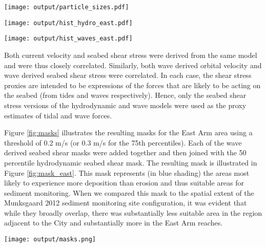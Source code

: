 \documentclass[a4paper]{article}
\let\origfigure=\figure
\let\endorigfigure=\endfigure
\renewenvironment{figure}[1][]{%
   \origfigure[H]
}{%
   \endorigfigure
}
\begin{document}
\begin{figure}
\centering\scriptsize
\texttt{[image: output/particle\_sizes.pdf]}
\caption{The percentage abundance of different sediment grain sizes
observed across the Munksgaard sediment sampling
program.\label{fig:particle_sizes}}
\end{figure}

\begin{figure}
\centering\scriptsize
\texttt{[image: output/hist\_hydro\_east.pdf]}
\caption{Frequency distributions of hydrodynamic products in the East
Arm area.\label{fig:hist_hydro_east}}
\end{figure}

\begin{figure}
\centering\scriptsize
\texttt{[image: output/hist\_waves\_east.pdf]}
\caption{Frequency distributions of wave modelling seabed shear stress
products in the East Arm area.\label{fig:hist_waves_east}}
\end{figure}

Both current velocity and seabed shear stress were derived from the same
model and were thus closely correlated. Similarly, both wave derived
orbital velocity and wave derived seabed shear stress were correlated.
In each case, the shear stress proxies are intended to be expressions of
the forces that are likely to be acting on the seabed (from tides and
waves respectively). Hence, only the seabed shear stress versions of the
hydrodynamic and wave models were used as the proxy estimates of tidal
and wave forces.

Figure \ref{fig:masks} illustrates the resulting masks for the East Arm
area using a threshold of 0.2 m/s (or 0.3 m/s for the 75th percentiles).
Each of the wave derived seabed shear masks were added together and then
joined with the 50 percentile hydrodynamic seabed shear mask. The
resulting mask is illustrated in Figure \ref{fig:mask_east}. This mask
represents (in blue shading) the areas most likely to experience more
deposition than erosion and thus suitable areas for sediment monitoring.
When we compared this mask to the spatial extent of the Munksgaard 2012
sediment monitoring site configuration, it was evident that while they
broadly overlap, there was substantially less suitable area in the
region adjacent to the City and substantially more in the East Arm
reaches.

\begin{figure}
\centering\scriptsize
\texttt{[image: output/masks.png]}
\caption{Individual East Arm masks from various hydrodynamic
(bedShear\_\emph{) and wave (beagle\_}) models categorised using a
threshold values of 0.2 for all other than the 75th percentile products
with use a threshold of 0.3 m/s. The blue areas indicate areas of
predicted relatively low erosion and transport potential and thus good
candidate areas for sample site allocation. The black dots illustrate
the position of Munksgaard 2012 sediment sampling
sites.\label{fig:masks}}
\end{figure}
\end{document}
